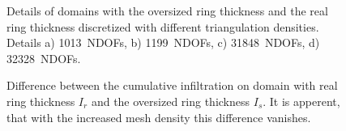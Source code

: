 \documentclass[review,times,3p,10pt]{elsarticle}
\begin{document}
{{ \begin{figure}
\centering
{}
 \caption{Details of domains with the oversized ring thickness and the real ring thickness discretized with different triangulation densities. Details a) 1013~NDOFs, b) 1199~NDOFs, c) 31848~NDOFs,  d) 32328~NDOFs. }
 \label{mesh-eval}
\end{figure}

 \begin{figure}
\centering
{}
 \caption{Difference between the cumulative infiltration on domain with real ring thickness $I_r$ and the oversized ring thickness $I_s$. It is apperent, that with the increased mesh density this difference vanishes.}
 \label{mesh-errs}
\end{figure}

}}
\end{document}
